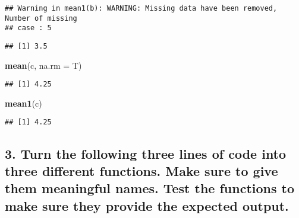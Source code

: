 \documentclass[
]{article}
\newenvironment{Shaded}{\begin{snugshade}}{\end{snugshade}}
\newcommand{\CommentTok}[1]{\textcolor[rgb]{0.56,0.35,0.01}{\textit{#1}}}
\newcommand{\ControlFlowTok}[1]{\textcolor[rgb]{0.13,0.29,0.53}{\textbf{#1}}}
\newcommand{\DataTypeTok}[1]{\textcolor[rgb]{0.13,0.29,0.53}{#1}}
\newcommand{\KeywordTok}[1]{\textcolor[rgb]{0.13,0.29,0.53}{\textbf{#1}}}
\newcommand{\NormalTok}[1]{#1}
\newcommand{\OperatorTok}[1]{\textcolor[rgb]{0.81,0.36,0.00}{\textbf{#1}}}
\newcommand{\StringTok}[1]{\textcolor[rgb]{0.31,0.60,0.02}{#1}}
\begin{document}
\begin{verbatim}
## Warning in mean1(b): WARNING: Missing data have been removed, Number of missing
## case : 5
\end{verbatim}

\begin{verbatim}
## [1] 3.5
\end{verbatim}

\begin{Shaded}
\begin{Highlighting}[]
\KeywordTok{mean}\NormalTok{(c, }\DataTypeTok{na.rm =}\NormalTok{ T)}
\end{Highlighting}
\end{Shaded}

\begin{verbatim}
## [1] 4.25
\end{verbatim}

\begin{Shaded}
\begin{Highlighting}[]
\KeywordTok{mean1}\NormalTok{(c)}
\end{Highlighting}
\end{Shaded}

\begin{verbatim}
## [1] 4.25
\end{verbatim}

\hypertarget{turn-the-following-three-lines-of-code-into-three-different-functions.-make-sure-to-give-them-meaningful-names.-test-the-functions-to-make-sure-they-provide-the-expected-output.}{%
\subsection{3. Turn the following three lines of code into three
different functions. Make sure to give them meaningful names. Test the
functions to make sure they provide the expected
output.}\label{turn-the-following-three-lines-of-code-into-three-different-functions.-make-sure-to-give-them-meaningful-names.-test-the-functions-to-make-sure-they-provide-the-expected-output.}}

\begin{Shaded}
\end{Shaded}
\end{document}
